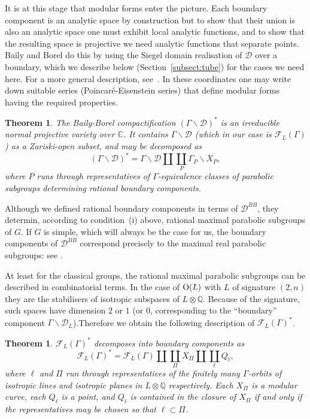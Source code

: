 \documentclass[a4paper,11pt]{article}
\newtheorem{theorem}[lemma]{Theorem}
\newcommand{\CC}{\mathbb C}
\newcommand{\QQ}{\mathbb Q}
\renewcommand{\cD}{\mathcal D}
\newcommand{\cF}{\mathcal F}
\newcommand{\Orth}{\mathop{\null\mathrm {O}}\nolimits}
\begin{document}
It is at this stage that modular forms enter the picture. Each
boundary component is an analytic space by construction but to show
that their union is also an analytic space one must exhibit local
analytic functions, and to show that the resulting space is projective
we need analytic functions that separate points. Baily and Borel do
this by using the Siegel domain realisation of $\cD$ over a boundary,
which we describe below (Section~\ref{subsect:tube}) for the cases we
need here. For a more general description, see~\cite{Sat}. In these
coordinates one may write down suitable series (Poincar\'e-Eisenstein
series) that define modular forms having the required properties.

\begin{theorem}\label{thm:BBdescription}
The Baily-Borel compactification $(\Gamma\backslash \cD)^*$ is an
irreducible normal projective variety over $\CC$. It contains
$\Gamma\backslash \cD$ (which in our case is $\cF_L(\Gamma)$) as a
Zariski-open subset, and may be decomposed as
\begin{equation}\label{BBboundarydecomposition}
(\Gamma\backslash \cD)^*=\Gamma\backslash \cD\amalg\coprod_P
  \Gamma_P\backslash X_P,
\end{equation}
where $P$ runs through representatives of $\Gamma$-equivalence classes
of parabolic subgroups determining rational boundary components.
\end{theorem}

Although we defined rational boundary components in terms of
$\cD^{BB}$, they determin, according to condition~(i) above, rational
maximal parabolic subgroups of $G$. If $G$ is simple, which will
always be the case for us, the boundary components of $\cD^{BB}$
correspond precisely to the maximal real parabolic subgroups: see
\cite [{\S}3.2, Proposition~2]{AMRT}.

At least for the classical groups, the rational maximal parabolic
subgroups can be described in combinatorial terms. In the case of
$\Orth(L)$ with $L$ of signature $(2,n)$ they are the stabilisers of
isotropic subspaces of $L\otimes \QQ$. Because of the signature, such
spaces have dimension $2$ or $1$ (or $0$, corresponding to the
``boundary'' component $\Gamma\backslash \cD_L$).Therefore we obtain
the following description of $\cF_L(\Gamma)^*$.
\begin{theorem}
$\cF_L(\Gamma)^*$ decomposes into boundary components as
\begin{equation}\label{boundarycomponents_orth}
\cF_L(\Gamma)^*=\cF_L(\Gamma)\amalg\coprod_\Pi X_\Pi \amalg
\coprod_\ell Q_\ell,
\end{equation}
where $\ell$ and $\Pi$ run through representatives of the finitely
many $\Gamma$-orbits of isotropic lines and isotropic planes in
$L\otimes \QQ$ respectively. Each $X_\Pi$ is a modular curve, each
$Q_\ell$ is a point, and $Q_\ell$ is contained in the closure of
$X_\Pi$ if and only if the representatives may be chosen so that
$\ell\subset \Pi$.
\end{theorem}
\end{document}
